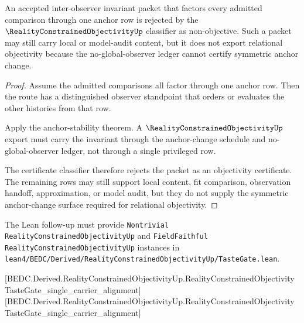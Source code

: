\begin{theorem}
\label{thm:reality-constrained-objectivity-falsifiable-separation}
An accepted inter-observer invariant packet that factors every admitted comparison through one anchor row is rejected by the $\RealityConstrainedObjectivityUp$ classifier as non-objective. Such a packet may still carry local or model-audit content, but it does not export relational objectivity because the no-global-observer ledger cannot certify symmetric anchor change.
\end{theorem}
\begin{proof}
Assume the admitted comparisons all factor through one anchor row. Then the route has a distinguished observer standpoint that orders or evaluates the other histories from that row.

Apply the anchor-stability theorem. A $\RealityConstrainedObjectivityUp$ export must carry the invariant through the anchor-change schedule and no-global-observer ledger, not through a single privileged row.

The certificate classifier therefore rejects the packet as an objectivity certificate. The remaining rows may still support local content, fit comparison, observation handoff, approximation, or model audit, but they do not supply the symmetric anchor-change surface required for relational objectivity.
\end{proof}



The Lean follow-up must provide \texttt{Nontrivial RealityConstrainedObjectivityUp} and \texttt{FieldFaithful RealityConstrainedObjectivityUp} instances in \texttt{lean4/BEDC/Derived/RealityConstrainedObjectivityUp/TasteGate.lean}.

[BEDC.Derived.RealityConstrainedObjectivityUp.RealityConstrainedObjectivityTasteGate\_single\_carrier\_alignment]
[BEDC.Derived.RealityConstrainedObjectivityUp.RealityConstrainedObjectivityTasteGate\_single\_carrier\_alignment]

